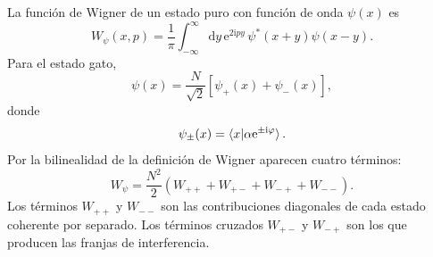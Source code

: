 \documentclass[11pt]{article}
\newcommand{\ii}{\mathrm{i}}
\newcommand{\ee}{\mathrm{e}}
\newcommand{\dd}{\mathrm{d}}
\begin{document}
La funci\'on de Wigner de un estado puro con funci\'on de onda $\psi(x)$ es
\begin{equation}
  W_\psi(x,p)
  =
  \frac1\pi
  \int_{-\infty}^{\infty}
  \dd y\,
  \ee^{2\ii py}\,
  \psi^*(x+y)\psi(x-y).
\end{equation}
Para el estado gato,
\begin{equation}
  \psi(x)=
  \frac{N}{\sqrt2}
  \left[\psi_+(x)+\psi_-(x)\right],
\end{equation}
donde
\begin{equation}
  \psi_\pm(x)
  =
  \braket{x|\alpha\ee^{\pm\ii\varphi}}.
\end{equation}
Por la bilinealidad de la definici\'on de Wigner aparecen cuatro t\'erminos:
\begin{equation}
  W_\psi
  =
  \frac{N^2}{2}
  \left(
  W_{++}+W_{+-}+W_{-+}+W_{--}
  \right).
\end{equation}
Los t\'erminos $W_{++}$ y $W_{--}$ son las contribuciones diagonales de cada
estado coherente por separado. Los t\'erminos cruzados $W_{+-}$ y $W_{-+}$ son
los que producen las franjas de interferencia.
\end{document}
